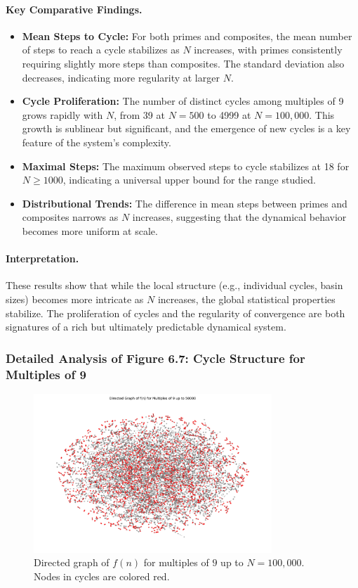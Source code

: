 \documentclass[12pt]{article}
\begin{document}
\paragraph{Key Comparative Findings.}
\begin{itemize}
    \item \textbf{Mean Steps to Cycle:} For both primes and composites, the mean number of steps to reach a cycle stabilizes as $N$ increases, with primes consistently requiring slightly more steps than composites. The standard deviation also decreases, indicating more regularity at larger $N$.
    \item \textbf{Cycle Proliferation:} The number of distinct cycles among multiples of 9 grows rapidly with $N$, from 39 at $N=500$ to 4999 at $N=100,000$. This growth is sublinear but significant, and the emergence of new cycles is a key feature of the system's complexity.
    \item \textbf{Maximal Steps:} The maximum observed steps to cycle stabilizes at 18 for $N \geq 1000$, indicating a universal upper bound for the range studied.
    \item \textbf{Distributional Trends:} The difference in mean steps between primes and composites narrows as $N$ increases, suggesting that the dynamical behavior becomes more uniform at scale.
\end{itemize}

\paragraph{Interpretation.} These results show that while the local structure (e.g., individual cycles, basin sizes) becomes more intricate as $N$ increases, the global statistical properties stabilize. The proliferation of cycles and the regularity of convergence are both signatures of a rich but ultimately predictable dynamical system.

\subsubsection*{Detailed Analysis of Figure 6.7: Cycle Structure for Multiples of 9}
\begin{figure}[H]
    \centering
    \includegraphics[width=0.8\textwidth]{fig_cycles_graph.png}
    \caption{Directed graph of $f(n)$ for multiples of $9$ up to $N=100,000$. Nodes in cycles are colored red.}
    \label{fig:cycles_graph}
\end{figure}
\end{document}
